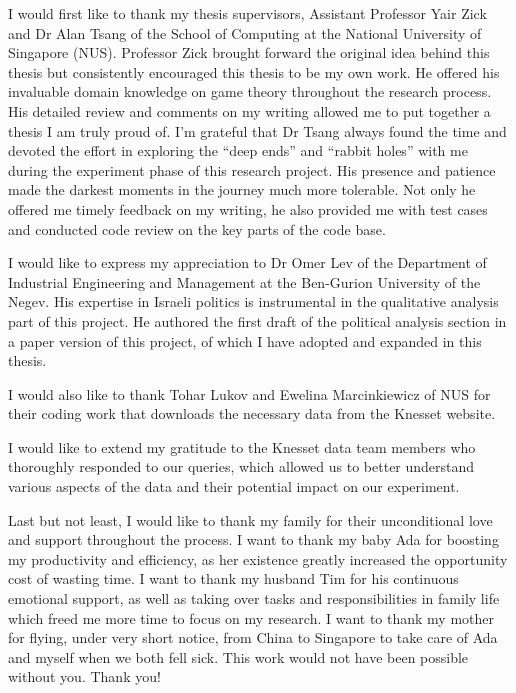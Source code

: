 \begin{acknowledgments}
  I would first like to thank my thesis supervisors, Assistant Professor
  Yair Zick and Dr Alan Tsang of the School of Computing at the National
  University of Singapore (NUS).
  Professor Zick brought forward the original idea behind this thesis but
  consistently encouraged this thesis to be my own work.
  He offered his invaluable domain knowledge on game theory throughout the
  research process.
  His detailed review and comments on my writing allowed me to put together
  a thesis I am truly proud of.
  I'm grateful that Dr Tsang always found the time and devoted the effort in
  exploring the ``deep ends'' and ``rabbit holes'' with me during the
  experiment phase of this research project.
  His presence and patience made the darkest moments in the journey much more
  tolerable.
  Not only he offered me timely feedback on my writing, he also provided me
  with test cases and conducted code review on the key parts of the code base.

  I would like to express my appreciation to Dr Omer Lev of the Department of
  Industrial Engineering and Management at the Ben-Gurion University of the
  Negev.
  His expertise in Israeli politics is instrumental in the qualitative analysis
  part of this project.
  He authored the first draft of the political analysis section in a paper
  version of this project, of which I have adopted and expanded in this thesis.

  I would also like to thank Tohar Lukov and Ewelina Marcinkiewicz of NUS for
  their coding work that downloads the necessary data from the Knesset website.

  I would like to extend my gratitude to the Knesset data team members who
  thoroughly responded to our queries, which allowed us to better understand
  various aspects of the data and their potential impact on our experiment.

  Last but not least, I would like to thank my family for their unconditional
  love and support throughout the process.
  I want to thank my baby Ada for boosting my productivity and efficiency, as
  her existence greatly increased the opportunity cost of wasting time.
  I want to thank my husband Tim for his continuous emotional support, as well
  as taking over tasks and responsibilities in family life which freed me more
  time to focus on my research.
  I want to thank my mother for flying, under very short notice, from China to
  Singapore to take care of Ada and myself when we both fell sick.
  This work would not have been possible without you. Thank you!

\end{acknowledgments}

